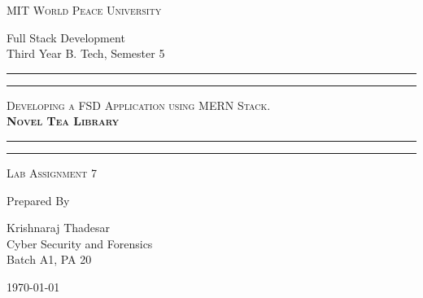 \documentclass[11pt]{article}
\begin{document}
\begin{titlepage}
    \centering


    \huge\textsc{
        MIT World Peace University
    }\\

    \vspace{0.75\baselineskip} %

    \LARGE{
        Full Stack Development\\
        Third Year B. Tech, Semester 5
    }

    \vfill %


    \rule{\textwidth}{1.6pt}\vspace*{-\baselineskip}\vspace*{2pt}
    \rule{\textwidth}{0.6pt}
    \vspace{0.75\baselineskip} %



    \huge{\textsc{
            Developing a FSD Application using MERN Stack. \\
            \textbf{ Novel Tea Library}
        }} \\



    \vspace{0.5\baselineskip} %
    \rule{\textwidth}{0.6pt}\vspace*{-\baselineskip}\vspace*{2.8pt}
    \rule{\textwidth}{1.6pt}

    \vspace{1\baselineskip} %


    \LARGE\textsc{
        Lab Assignment 7
    } %
    \vfill


    Prepared By
    \vspace{0.5\baselineskip} %

    \Large{
        Krishnaraj Thadesar \\
        Cyber Security and Forensics\\
        Batch A1, PA 20
    }


    \vspace{0.5\baselineskip} %
    \today

\end{titlepage}
\end{document}

